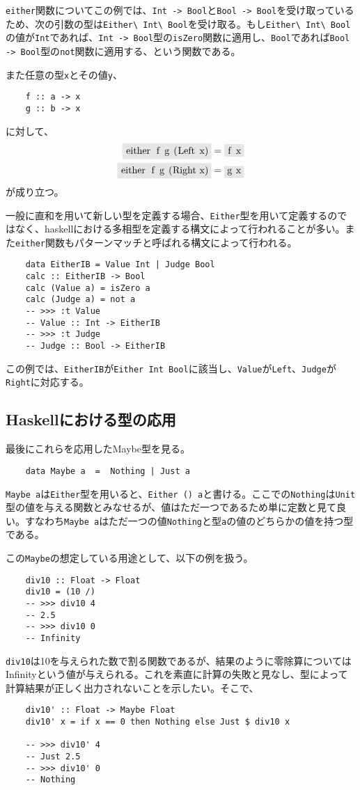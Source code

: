 \documentclass[uplatex,dvipdfmx]{jsarticle}
\newcommand{\pr}[1]{\colorbox[rgb]{0.9,0.9,0.9}{\lstinline{#1}}}
\newcommand{\functype}[2]{\pr{#1 -> #2}}
\begin{document}
  \pr{either}関数についてこの例では、\functype{Int}{Bool}と\functype{Bool}{Bool}を受け取っているため、次の引数の型は\pr{Either\ Int\ Bool}を受け取る。もし\pr{Either\ Int\ Bool}の値が\pr{Int}であれば、\functype{Int}{Bool}型の\pr{isZero}関数に適用し、\pr{Bool}であれば\functype{Bool}{Bool}型の\pr{not}関数に適用する、という関数である。

  また任意の型\pr{x}とその値\pr{y}、
  \begin{lstlisting}
    f :: a -> x
    g :: b -> x
  \end{lstlisting}に対して、
  \begin{align*}
    \pr{either f g (Left x)}&=\pr{f x}\\
    \pr{either f g (Right x)}&=\pr{g x}
  \end{align*}
  が成り立つ。

  一般に直和を用いて新しい型を定義する場合、\pr{Either}型を用いて定義するのではなく、haskellにおける多相型を定義する構文によって行われることが多い。また\pr{either}関数もパターンマッチと呼ばれる構文によって行われる。

  \begin{lstlisting}
    data EitherIB = Value Int | Judge Bool
    calc :: EitherIB -> Bool
    calc (Value a) = isZero a
    calc (Judge a) = not a
    -- >>> :t Value
    -- Value :: Int -> EitherIB
    -- >>> :t Judge
    -- Judge :: Bool -> EitherIB
  \end{lstlisting}
  この例では、\pr{EitherIB}が\pr{Either Int Bool}に該当し、\pr{Value}が\pr{Left}、\pr{Judge}が\pr{Right}に対応する。
  \subsection{Haskellにおける型の応用}
  最後にこれらを応用したMaybe型を見る。
  \begin{lstlisting}
    data Maybe a  =  Nothing | Just a
  \end{lstlisting}
  \pr{Maybe a}は\pr{Either}型を用いると、\pr{Either () a}と書ける。ここでの\pr{Nothing}は\pr{Unit}型の値を与える関数とみなせるが、値はただ一つであるため単に定数と見て良い。すなわち\pr{Maybe a}はただ一つの値\pr{Nothing}と型\pr{a}の値のどちらかの値を持つ型である。

  この\pr{Maybe}の想定している用途として、以下の例を扱う。
  \begin{lstlisting}
    div10 :: Float -> Float
    div10 = (10 /)
    -- >>> div10 4
    -- 2.5
    -- >>> div10 0
    -- Infinity
  \end{lstlisting}
  \pr{div10}は10を与えられた数で割る関数であるが、結果のように零除算についてはInfinityという値が与えられる。これを素直に計算の失敗と見なし、型によって計算結果が正しく出力されないことを示したい。そこで、
  \begin{lstlisting}
    div10' :: Float -> Maybe Float
    div10' x = if x == 0 then Nothing else Just $ div10 x

    -- >>> div10' 4
    -- Just 2.5
    -- >>> div10' 0
    -- Nothing
  \end{lstlisting}
\end{document}
